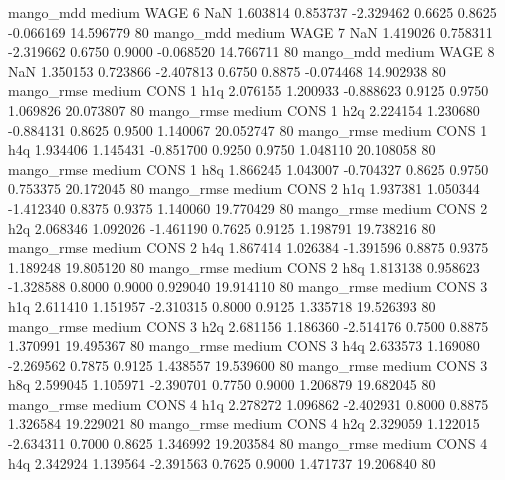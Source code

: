         mango_mdd     medium     WAGE                 6                  NaN  1.603814 0.853737 -2.329462 0.6625 0.8625 -0.066169   14.596779 80
        mango_mdd     medium     WAGE                 7                  NaN  1.419026 0.758311 -2.319662 0.6750 0.9000 -0.068520   14.766711 80
        mango_mdd     medium     WAGE                 8                  NaN  1.350153 0.723866 -2.407813 0.6750 0.8875 -0.074468   14.902938 80
       mango_rmse     medium     CONS                 1                  h1q  2.076155 1.200933 -0.888623 0.9125 0.9750  1.069826   20.073807 80
       mango_rmse     medium     CONS                 1                  h2q  2.224154 1.230680 -0.884131 0.8625 0.9500  1.140067   20.052747 80
       mango_rmse     medium     CONS                 1                  h4q  1.934406 1.145431 -0.851700 0.9250 0.9750  1.048110   20.108058 80
       mango_rmse     medium     CONS                 1                  h8q  1.866245 1.043007 -0.704327 0.8625 0.9750  0.753375   20.172045 80
       mango_rmse     medium     CONS                 2                  h1q  1.937381 1.050344 -1.412340 0.8375 0.9375  1.140060   19.770429 80
       mango_rmse     medium     CONS                 2                  h2q  2.068346 1.092026 -1.461190 0.7625 0.9125  1.198791   19.738216 80
       mango_rmse     medium     CONS                 2                  h4q  1.867414 1.026384 -1.391596 0.8875 0.9375  1.189248   19.805120 80
       mango_rmse     medium     CONS                 2                  h8q  1.813138 0.958623 -1.328588 0.8000 0.9000  0.929040   19.914110 80
       mango_rmse     medium     CONS                 3                  h1q  2.611410 1.151957 -2.310315 0.8000 0.9125  1.335718   19.526393 80
       mango_rmse     medium     CONS                 3                  h2q  2.681156 1.186360 -2.514176 0.7500 0.8875  1.370991   19.495367 80
       mango_rmse     medium     CONS                 3                  h4q  2.633573 1.169080 -2.269562 0.7875 0.9125  1.438557   19.539600 80
       mango_rmse     medium     CONS                 3                  h8q  2.599045 1.105971 -2.390701 0.7750 0.9000  1.206879   19.682045 80
       mango_rmse     medium     CONS                 4                  h1q  2.278272 1.096862 -2.402931 0.8000 0.8875  1.326584   19.229021 80
       mango_rmse     medium     CONS                 4                  h2q  2.329059 1.122015 -2.634311 0.7000 0.8625  1.346992   19.203584 80
       mango_rmse     medium     CONS                 4                  h4q  2.342924 1.139564 -2.391563 0.7625 0.9000  1.471737   19.206840 80
